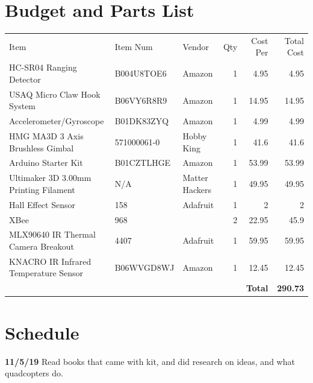 \clearpage

\section{Budget and Parts List}

\begin{table}[!htbp]
\begin{tabular}{lllrrr}
Item                                  & Item Num    & Vendor         & Qty & Cost Per & Total Cost \\
HC-SR04 Ranging Detector              & B004U8TOE6  & Amazon         & 1   & 4.95     & 4.95       \\
USAQ Micro Claw Hook System           & B06VY6R8R9  & Amazon         & 1   & 14.95    & 14.95      \\
Accelerometer/Gyroscope               & B01DK83ZYQ  & Amazon         & 1   & 4.99     & 4.99       \\
HMG MA3D 3 Axis Brushless Gimbal      & 571000061-0 & Hobby King     & 1   & 41.6     & 41.6       \\
Arduino Starter Kit                   & B01CZTLHGE  & Amazon         & 1   & 53.99    & 53.99      \\
Ultimaker 3D 3.00mm Printing Filament & N/A         & Matter Hackers & 1   & 49.95    & 49.95      \\
Hall Effect Sensor                    & 158         & Adafruit       & 1   & 2        & 2          \\
XBee                                  & 968         &                & 2   & 22.95    & 45.9       \\
MLX90640 IR Thermal Camera Breakout   & 4407        & Adafruit       & 1   & 59.95    & 59.95      \\
KNACRO IR Infrared Temperature Sensor & B06WVGD8WJ  & Amazon         & 1   & 12.45    & 12.45      \\
                                      &             &                &     & \textbf{Total}    & \textbf{290.73}    
\end{tabular}
\end{table}

\section{Schedule}

\textbf{11/5/19}    Read books that came with kit, and did research on ideas, and what quadcopters do.

